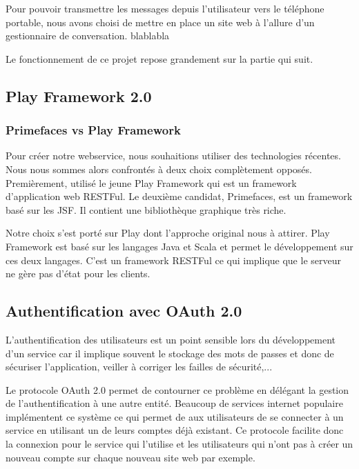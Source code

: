 Pour pouvoir transmettre les messages depuis l'utilisateur vers le téléphone portable, nous avons
choisi de mettre en place un site web à l'allure d'un gestionnaire de conversation. 
blablabla

Le fonctionnement de ce projet repose grandement sur la partie qui suit.



\subsection{Play Framework 2.0}

\subsubsection{Primefaces vs Play Framework}

Pour créer notre webservice, nous souhaitions utiliser des technologies récentes. Nous nous sommes
alors confrontés à deux choix complètement opposés. Premièrement, utilisé le jeune Play Framework 
qui est un framework d'application web RESTFul. Le deuxième candidat, Primefaces, est un framework
basé sur les JSF. Il contient une bibliothèque graphique très riche.

Notre choix s'est porté sur Play dont l'approche original nous à attirer. Play Framework est basé sur
les langages Java et Scala et permet le développement sur ces deux langages. C'est un framework RESTFul
ce qui implique que le serveur ne gère pas d'état pour les clients.


\subsection{Authentification avec OAuth 2.0} %

L'authentification des utilisateurs est un point sensible lors du développement d'un service car il
implique souvent le stockage des mots de passes et donc de sécuriser l'application, veiller à corriger
les failles de sécurité,... 

Le protocole OAuth 2.0 permet de contourner ce problème en délégant la gestion de l'authentification
à une autre entité. Beaucoup de services internet populaire implémentent ce système ce qui permet de 
aux utilisateurs de se connecter à un service en utilisant un de leurs comptes déjà existant. Ce 
protocole facilite donc la connexion pour le service qui l'utilise et les utilisateurs qui n'ont pas 
à créer un nouveau compte sur chaque nouveau site web par exemple.

